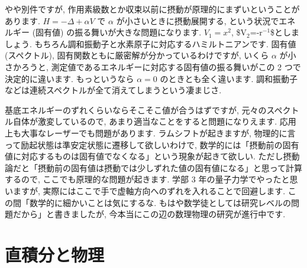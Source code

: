 \documentclass[openany, a4paper, oneside]{book}
\theoremstyle{break}
\theoremstyle{breakdefn}
\begin{document}
やや別件ですが, 作用素級数とか収束以前に摂動が原理的にまずいということがあります.
$H = - \Delta + \alpha V$ で $\alpha$ が小さいときに摂動展開する,
という状況でエネルギー (固有値) の振る舞いが大きな問題になります.
$V_1 = x^2$, \$V$_2$=-r$^{\mathrm{-1}}$\$としましょう.
もちろん調和振動子と水素原子に対応するハミルトニアンです.
固有値 (スペクトル), 固有関数ともに厳密解が分かっているわけですが,
いくら $\alpha$ が小さかろうと, 測定値であるエネルギーに対応する固有値の振る舞いがこの 2 つで決定的に違います.
もっというなら $\alpha = 0$ のときとも全く違います.
調和振動子などは連続スペクトルが全て消えてしまうという凄まじさ.

基底エネルギーのずれくらいならそこそこ値が合うはずですが,
元々のスペクトル自体が激変しているので, あまり適当なことをすると問題になりえます.
応用上も大事なレーザーでも問題があります.
ラムシフトが起きますが, 物理的に言って励起状態は準安定状態に遷移して欲しいわけで,
数学的には「摂動前の固有値に対応するものは固有値でなくなる」という現象が起きて欲しい.
ただし摂動論だと「摂動前の固有値は摂動では少しずれた値の固有値になる」と思って計算するので, ここでも原理的な問題が起きます.
学部 3 年の量子力学でやったと思いますが, 実際にはここで手で虚軸方向へのずれを入れることで回避します.
この間「数学的に細かいことは気にするな.
もはや数学徒としては研究レベルの問題だから」と書きましたが,
今本当にこの辺の数理物理の研究が進行中です.
\chapter{直積分と物理}
\label{sec-7-18}
\end{document}
